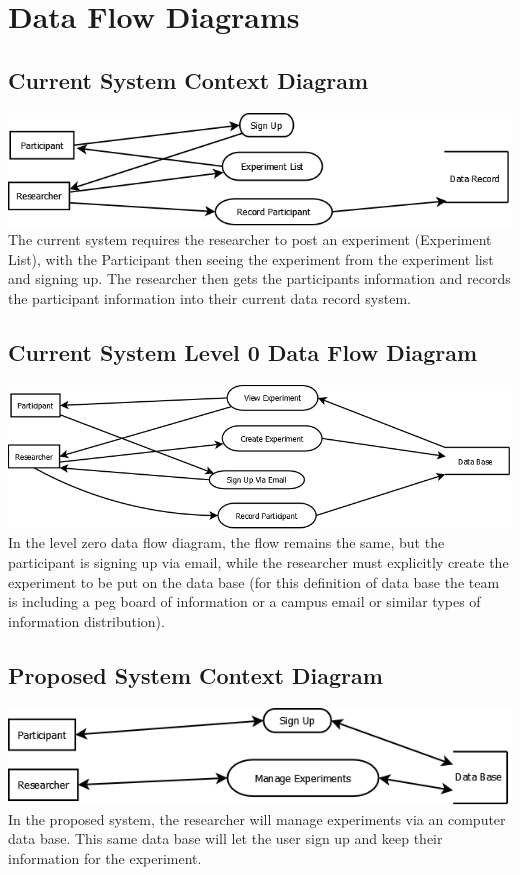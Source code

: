\section{Data Flow Diagrams}
\subsection{Current System Context Diagram}
\includegraphics[width=6in]{../other/data-flow-diagrams/current_system_context_diagram.png}\\
The current system requires the researcher to post an experiment (Experiment List), with the Participant then seeing the experiment from the experiment list and signing up.  The researcher then gets the participants information and records the participant information into their current data record system.

\subsection{Current System Level 0 Data Flow Diagram}
\includegraphics[width=6in]{../other/data-flow-diagrams/current_system_level0.png}\\
In the level zero data flow diagram, the flow remains the same, but the participant is signing up via email, while the researcher must explicitly create the experiment to be put on the data base (for this definition of data base the team is including a peg board of information or a campus email or similar types of information distribution).

\subsection{Proposed System Context Diagram}
\includegraphics[width=6in]{../other/data-flow-diagrams/new_system_context.png}\\
In the proposed system, the researcher will manage experiments via an computer data base.  This same data base will let the user sign up and keep their information for the experiment.

